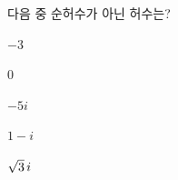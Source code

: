 다음 중 순허수가 아닌 허수는?
\begin{choices32}{\rule[-3ex]{0pt}{8ex}$-3$}{\rule[-3ex]{0pt}{8ex}$0$}{\rule[-3ex]{0pt}{8ex}$-5i$}{\rule[-3ex]{0pt}{8ex}$1-i$}{\rule[-3ex]{0pt}{8ex}$\sqrt{3}\mkern3mu i$}\end{choices32}
